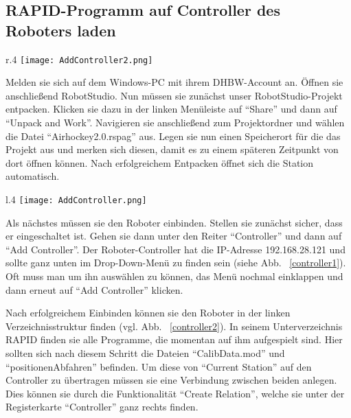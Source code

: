 \subsection{RAPID-Programm auf Controller des Roboters laden}

\begin{wrapfigure}{r}{.4\textwidth}
\centering
\texttt{[image: AddController2.png]}
\vspace{-15pt}
\caption{Controller hinzufügen} 
\label{controller1}
\end{wrapfigure}

Melden sie sich auf dem Windows-PC mit ihrem DHBW-Account an. Öffnen sie anschließend RobotStudio. Nun müssen sie zunächst unser RobotStudio-Projekt entpacken. Klicken sie dazu in der linken Menüleiste auf \enquote{Share} und dann auf \enquote{Unpack and Work}. Navigieren sie anschließend zum Projektordner und wählen die Datei \enquote{Airhockey2.0.rspag} aus. Legen sie nun einen Speicherort für die das Projekt aus und merken sich diesen, damit es zu einem späteren Zeitpunkt von dort öffnen können. Nach erfolgreichem Entpacken öffnet sich die Station automatisch. 

\begin{wrapfigure}{l}{.4\textwidth}
\centering
\texttt{[image: AddController.png]}
\vspace{-15pt}
\caption{Verzeichnisstruktur} 
\label{controller2}
\end{wrapfigure}

Als nächstes müssen sie den Roboter einbinden. Stellen sie zunächst sicher, dass er eingeschaltet ist. Gehen sie dann unter den Reiter \enquote{Controller} und dann auf \enquote{Add Controller}. Der Roboter-Controller hat die IP-Adresse 192.168.28.121 und sollte ganz unten im Drop-Down-Menü zu finden sein (siehe Abb. ~\ref{controller1}). Oft muss man um ihn auswählen zu können, das Menü nochmal einklappen und dann erneut auf \enquote{Add Controller} klicken. 

Nach erfolgreichem Einbinden können sie den Roboter in der linken Verzeichnisstruktur finden (vgl. Abb. ~\ref{controller2}). In seinem Unterverzeichnis RAPID finden sie alle Programme, die momentan auf ihm aufgespielt sind. Hier sollten sich nach diesem Schritt die Dateien \enquote{CalibData.mod} und \enquote{positionenAbfahren} befinden. Um diese von \enquote{Current Station} auf den Controller zu übertragen müssen sie eine Verbindung zwischen beiden anlegen. Dies können sie durch die Funktionalität \enquote{Create Relation}, welche sie unter der Registerkarte \enquote{Controller} ganz rechts finden.


